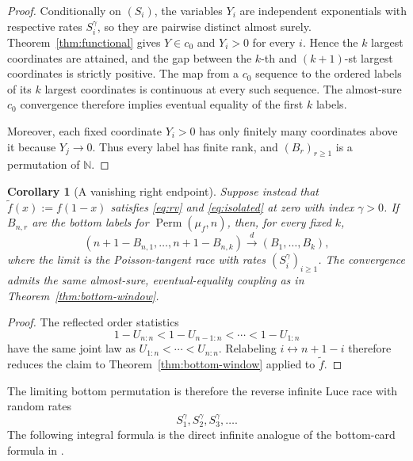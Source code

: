 \documentclass[11pt]{article}
\numberwithin{equation}{section}
\newtheorem{corollary}[theorem]{Corollary}
\theoremstyle{definition}
\theoremstyle{remark}
\newcommand{\N}{\mathbb N}
\newcommand{\Perm}{\operatorname{Perm}}
\begin{document}
\begin{proof}
Conditionally on $(S_i)$, the variables $Y_i$ are independent exponentials with respective rates $S_i^\gamma$, so they are pairwise distinct almost surely.  Theorem~\ref{thm:functional} gives $Y\in c_0$ and $Y_i>0$ for every $i$.  Hence the $k$ largest coordinates are attained, and the gap between the $k$-th and $(k+1)$-st largest coordinates is strictly positive.  The map from a $c_0$ sequence to the ordered labels of its $k$ largest coordinates is continuous at every such sequence.  The almost-sure $c_0$ convergence therefore implies eventual equality of the first $k$ labels.

Moreover, each fixed coordinate $Y_i>0$ has only finitely many coordinates above it because $Y_j\to0$.  Thus every label has finite rank, and $(B_r)_{r\geq1}$ is a permutation of $\N$.
\end{proof}

\begin{corollary}[A vanishing right endpoint]
\label{cor:right-endpoint}
Suppose instead that $\widetilde f(x):=f(1-x)$ satisfies
\eqref{eq:rv} and \eqref{eq:isolated} at zero with index $\gamma>0$.
If $B_{n,r}$ are the bottom labels for $\Perm(\mu_f,n)$, then, for every
fixed $k$,
\begin{equation}
  (n+1-B_{n,1},\ldots,n+1-B_{n,k})
  \xrightarrow{d}(B_1,\ldots,B_k),
  \label{eq:right-endpoint-reflection}
\end{equation}
where the limit is the Poisson-tangent race with rates
$(S_i^\gamma)_{i\geq1}$.  The convergence admits the same almost-sure,
eventual-equality coupling as in Theorem~\ref{thm:bottom-window}.
\end{corollary}

\begin{proof}
The reflected order statistics
\[
  1-U_{n:n}<1-U_{n-1:n}<\cdots<1-U_{1:n}
\]
have the same joint law as $U_{1:n}<\cdots<U_{n:n}$.  Relabeling
$i\leftrightarrow n+1-i$ therefore reduces the claim to
Theorem~\ref{thm:bottom-window} applied to $\widetilde f$.
\end{proof}

The limiting bottom permutation is therefore the reverse infinite Luce race with random rates
\begin{equation}
  S_1^\gamma,S_2^\gamma,S_3^\gamma,\ldots.
  \label{eq:random-rate-environment}
\end{equation}
The following integral formula is the direct infinite analogue of the bottom-card formula in \cite[Theorem~4.2]{CDK}.
\end{document}
